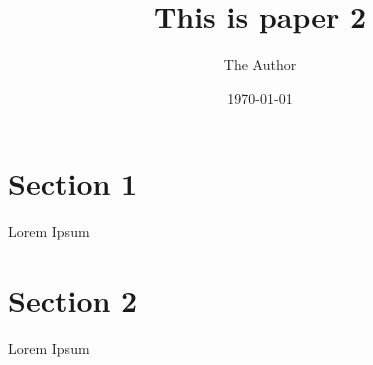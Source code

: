 \documentclass[11pt]{article}
\title{This is paper 2}
\author{ The Author }
\date{\today}
\begin{document}
\maketitle
\pagebreak



\section{Section 1}

Lorem Ipsum


\pagebreak

\section{Section 2}

Lorem Ipsum \\

\end{document}
